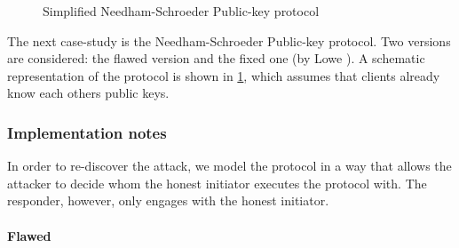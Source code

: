 \begin{figure}[t]
    \setmscoptions
    \begin{msc}{}
    
    

    \nextlevel[4]


    \nextlevel[3]    
    \nextlevel



    \nextlevel[3]
    \nextlevel[2]

    \end{msc}

    \centering
    \caption{Simplified Needham-Schroeder Public-key protocol}
    \label{fig:NSPK}
\end{figure}

The next case-study is the Needham-Schroeder Public-key protocol. Two versions are considered: the flawed version and the fixed one (by Lowe \cite{NSPK_LoweGavin}). A schematic representation of the protocol is shown in \cref{fig:NSPK}, which assumes that clients already know each others public keys.

\subsubsection{Implementation notes}

In order to re-discover the attack, we model the protocol in a way that allows the attacker to decide whom the honest initiator executes the protocol with. The responder, however, only engages with the honest initiator.

\paragraph{Flawed} 